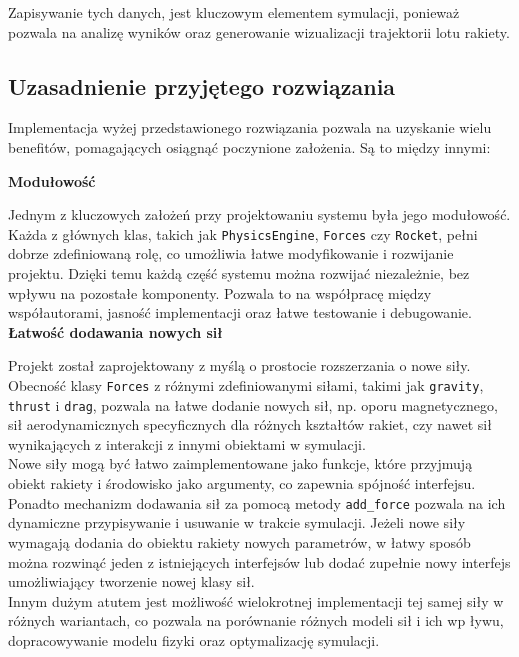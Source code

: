 Zapisywanie tych danych, jest kluczowym elementem symulacji, ponieważ pozwala na analizę wyników oraz generowanie wizualizacji trajektorii lotu rakiety.

\subsection{Uzasadnienie przyjętego rozwiązania}

Implementacja wyżej przedstawionego rozwiązania pozwala na uzyskanie wielu
benefitów, pomagających osiągnąć poczynione założenia. Są to między innymi:

\textbf{Modułowość}

Jednym z kluczowych założeń przy projektowaniu systemu była jego modułowość.
Każda z głównych klas, takich jak \texttt{PhysicsEngine}, \texttt{Forces} czy \texttt{Rocket}, pełni dobrze zdefiniowaną rolę, co umożliwia łatwe modyfikowanie i rozwijanie projektu. Dzięki temu każdą część systemu można rozwijać niezależnie, bez wpływu na pozostałe komponenty. Pozwala to na współpracę między współautorami, jasność implementacji oraz łatwe testowanie i debugowanie.\\

\textbf{Łatwość dodawania nowych sił}

Projekt został zaprojektowany z myślą o prostocie rozszerzania o nowe siły. Obecność klasy \texttt{Forces} z różnymi zdefiniowanymi siłami, takimi jak \texttt{gravity}, \texttt{thrust} i \texttt{drag}, pozwala na łatwe dodanie nowych sił, np. oporu magnetycznego, sił aerodynamicznych specyficznych dla różnych kształtów rakiet, czy nawet sił wynikających z interakcji z innymi obiektami w symulacji.
\\Nowe siły mogą być łatwo zaimplementowane jako funkcje, które przyjmują
obiekt rakiety i środowisko jako argumenty, co zapewnia spójność interfejsu.
Ponadto mechanizm dodawania sił za pomocą metody \texttt{add\_force}
pozwala na ich dynamiczne przypisywanie i usuwanie w trakcie symulacji.
Jeżeli nowe siły wymagają dodania do obiektu rakiety nowych parametrów, w
łatwy sposób można rozwinąć jeden z istniejących interfejsów lub dodać
zupełnie nowy interfejs umożliwiający tworzenie nowej klasy sił.\\
Innym dużym atutem jest możliwość wielokrotnej implementacji tej samej siły w
różnych wariantach, co pozwala na porównanie różnych modeli sił i ich wp
ływu, dopracowywanie modelu fizyki oraz optymalizację symulacji.\\

